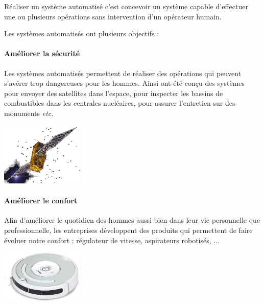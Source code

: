 \documentclass[10pt,fleqn]{article} %
\begin{document}
Réaliser un système automatisé c'est concevoir un système capable d'effectuer une ou plusieurs opérations sans intervention d'un opérateur humain. 

Les systèmes automatisés ont plusieurs objectifs : 
\paragraph*{Améliorer la sécurité}
\begin{minipage}[c]{0.7\textwidth}
 Les systèmes automatisés permettent de réaliser des opérations qui peuvent
s'avérer trop dangereuses pour les hommes. Ainsi ont-été conçu des systèmes
pour envoyer des satellites dans l'espace, pour inspecter les bassins de
combustibles dans les centrales nucléaires, pour assurer l'entretien sur des
monuments \textit{etc.}
\end{minipage}\hfill
\begin{minipage}[c]{0.2\textwidth}
 \begin{center}
 \includegraphics[height=3cm]{images/satellite}
 \end{center}
\end{minipage}

\paragraph*{Améliorer le confort}
\begin{minipage}[c]{0.7\textwidth}
Afin d'améliorer le quotidien des hommes aussi bien dans leur vie personnelle
que professionnelle, les entreprises développent des produits qui permettent de
faire évoluer notre confort : régulateur de vitesse, aspirateurs robotisés, ...
\end{minipage}\hfill
\begin{minipage}[c]{0.2\textwidth}
 \begin{center}
 \includegraphics[height=2.5cm]{images/aspi}
 \end{center}
\end{minipage}
\end{document}
